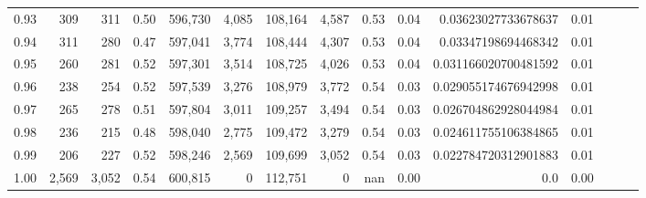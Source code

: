 \begin{tabular}{rrrrrrrrrrrrrrr}
0.93 &     309 &    311 &  0.50 &  596,730 &    4,085 &  108,164 &    4,587 &  0.53 &  0.04 &   0.03623027733678637 &      0.01 \\
0.94 &     311 &    280 &  0.47 &  597,041 &    3,774 &  108,444 &    4,307 &  0.53 &  0.04 &   0.03347198694468342 &      0.01 \\
0.95 &     260 &    281 &  0.52 &  597,301 &    3,514 &  108,725 &    4,026 &  0.53 &  0.04 &  0.031166020700481592 &      0.01 \\
0.96 &     238 &    254 &  0.52 &  597,539 &    3,276 &  108,979 &    3,772 &  0.54 &  0.03 &  0.029055174676942998 &      0.01 \\
0.97 &     265 &    278 &  0.51 &  597,804 &    3,011 &  109,257 &    3,494 &  0.54 &  0.03 &  0.026704862928044984 &      0.01 \\
0.98 &     236 &    215 &  0.48 &  598,040 &    2,775 &  109,472 &    3,279 &  0.54 &  0.03 &  0.024611755106384865 &      0.01 \\
0.99 &     206 &    227 &  0.52 &  598,246 &    2,569 &  109,699 &    3,052 &  0.54 &  0.03 &  0.022784720312901883 &      0.01 \\
1.00 &   2,569 &  3,052 &  0.54 &  600,815 &        0 &  112,751 &        0 &   nan &  0.00 &                   0.0 &      0.00 \\
\bottomrule
\end{tabular}

